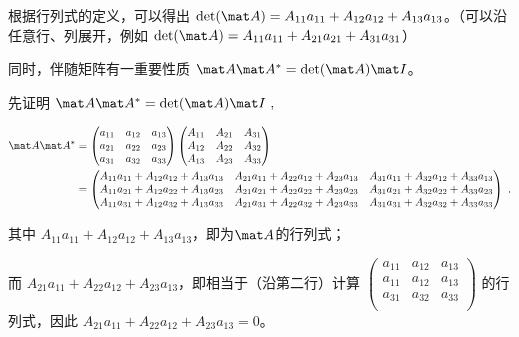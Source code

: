 根据行列式的定义，可以得出 $\det(\mat A) = A_{11}a_{11}+A_{12}a_{12}+A_{13}a_{13}$。（可以沿任意行、列展开，例如 $\det(\mat A) = A_{11}a_{11}+A_{21}a_{21}+A_{31}a_{31}$）

同时，伴随矩阵有一重要性质 $\mat A \mat A^* = \det(\mat A)\mat I$。

先证明 $\mat A \mat A^* = \det(\mat A)\mat I~,$

\begin{equation}
\begin{aligned}
\mat A \mat A^* &=
\begin{pmatrix}
a_{11}&a_{12}&a_{13}\\
a_{21}&a_{22}&a_{23}\\
a_{31}&a_{32}&a_{33}\\
\end{pmatrix}
\begin{pmatrix}
A_{11}&A_{21}&A_{31}\\
A_{12}&A_{22}&A_{32}\\
A_{13}&A_{23}&A_{33}\\
\end{pmatrix}\\
&=
\begin{pmatrix}
A_{11}a_{11}+A_{12}a_{12}+A_{13}a_{13}&A_{21}a_{11}+A_{22}a_{12}+A_{23}a_{13}&A_{31}a_{11}+A_{32}a_{12}+A_{33}a_{13}\\
A_{11}a_{21}+A_{12}a_{22}+A_{13}a_{23}&A_{21}a_{21}+A_{22}a_{22}+A_{23}a_{23}&A_{31}a_{21}+A_{32}a_{22}+A_{33}a_{23}\\
A_{11}a_{31}+A_{12}a_{32}+A_{13}a_{33}&A_{21}a_{31}+A_{22}a_{32}+A_{23}a_{33}&A_{31}a_{31}+A_{32}a_{32}+A_{33}a_{33}\\
\end{pmatrix}~.
\end{aligned}
\end{equation}

其中
$A_{11}a_{11}+A_{12}a_{12}+A_{13}a_{13}$，即为$\mat A$的行列式；

而
$A_{21}a_{11}+A_{22}a_{12}+A_{23}a_{13}$，即相当于（沿第二行）计算
$\begin{pmatrix}
a_{11}&a_{12}&a_{13}\\
a_{11}&a_{12}&a_{13}\\
a_{31}&a_{32}&a_{33}\\
\end{pmatrix}$
的行列式，因此 $A_{21}a_{11}+A_{22}a_{12}+A_{23}a_{13}=0$。

